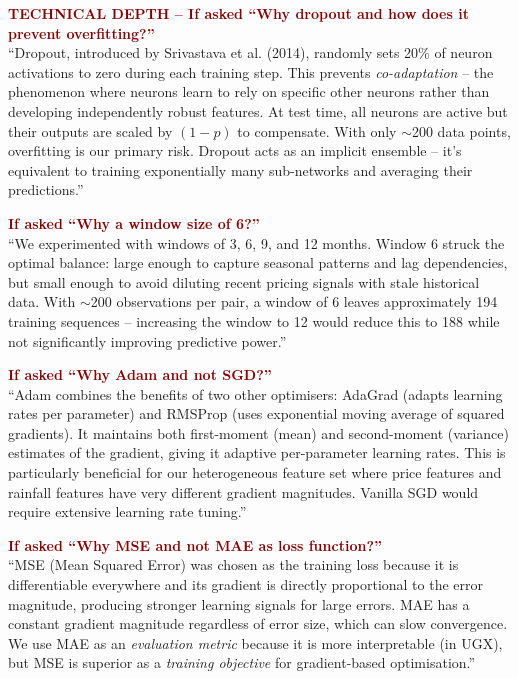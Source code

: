 \documentclass[11pt,a4paper]{article}
\begin{document}
\begin{mdframed}[backgroundcolor=red!5, linecolor=darkred]
\textcolor{darkred}{\textbf{TECHNICAL DEPTH -- If asked ``Why dropout and how does it prevent overfitting?''}}\\
``Dropout, introduced by Srivastava et al. (2014), randomly sets 20\% of neuron activations to zero during each training step. This prevents \textit{co-adaptation} -- the phenomenon where neurons learn to rely on specific other neurons rather than developing independently robust features. At test time, all neurons are active but their outputs are scaled by $(1 - p)$ to compensate. With only $\sim$200 data points, overfitting is our primary risk. Dropout acts as an implicit ensemble -- it's equivalent to training exponentially many sub-networks and averaging their predictions.''

\textcolor{darkred}{\textbf{If asked ``Why a window size of 6?''}}\\
``We experimented with windows of 3, 6, 9, and 12 months. Window 6 struck the optimal balance: large enough to capture seasonal patterns and lag dependencies, but small enough to avoid diluting recent pricing signals with stale historical data. With $\sim$200 observations per pair, a window of 6 leaves approximately 194 training sequences -- increasing the window to 12 would reduce this to 188 while not significantly improving predictive power.''

\textcolor{darkred}{\textbf{If asked ``Why Adam and not SGD?''}}\\
``Adam combines the benefits of two other optimisers: AdaGrad (adapts learning rates per parameter) and RMSProp (uses exponential moving average of squared gradients). It maintains both first-moment (mean) and second-moment (variance) estimates of the gradient, giving it adaptive per-parameter learning rates. This is particularly beneficial for our heterogeneous feature set where price features and rainfall features have very different gradient magnitudes. Vanilla SGD would require extensive learning rate tuning.''

\textcolor{darkred}{\textbf{If asked ``Why MSE and not MAE as loss function?''}}\\
``MSE (Mean Squared Error) was chosen as the training loss because it is differentiable everywhere and its gradient is directly proportional to the error magnitude, producing stronger learning signals for large errors. MAE has a constant gradient magnitude regardless of error size, which can slow convergence. We use MAE as an \textit{evaluation metric} because it is more interpretable (in UGX), but MSE is superior as a \textit{training objective} for gradient-based optimisation.''
\end{mdframed}
\end{document}
